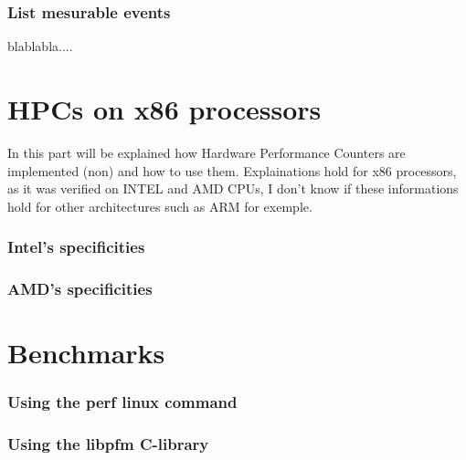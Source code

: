 \documentclass{rapport}
\begin{document}
	\section{List mesurable events}

	blablabla....

	\part{HPCs on x86 processors}

	In this part will be explained how Hardware Performance Counters are implemented (non) and how to use them.
	Explainations hold for x86 processors, as it was verified on INTEL and AMD CPUs, I don't know if these informations hold for other architectures such as ARM for exemple.

	\section{Intel's specificities}

	\section{AMD's specificities}

	\part{Benchmarks}

	\section{Using the perf linux command}

	\section{Using the libpfm C-library}

	\pageblanche
	
	
\end{document}
